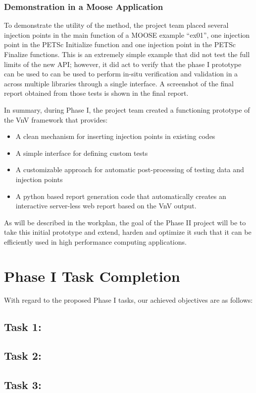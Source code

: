 \subsubsection{ Demonstration in a Moose Application } 
To demonstrate the utility of the method, the project team placed several injection points 
in the main function of a MOOSE example ``ex01'', one injection point in the PETSc Initialize function and 
one injection point in the PETSc Finalize functions. This is an extremely simple example that 
did not test the full limits of the new API; however, it did act to verify that the phase I prototype 
can be used to can be used to perform in-situ verification and validation in a across multiple libraries 
through a single interface. A screenshot of the final \VV report obtained from those tests is shown in the 
final report. 

In summary, during Phase I, the project team created a functioning prototype of the VnV framework that provides:
\begin{itemize}
 \item A clean mechanism for inserting injection points in existing codes
 \item A simple interface for defining custom tests 
 \item A customizable approach for automatic post-processing of testing data and injection points
 \item A python based report generation code that automatically creates an interactive server-less web report based on the VnV output.
\end{itemize}

As will be described in the workplan, the goal of the Phase II project will be to take this initial prototype and extend, harden and 
optimize it such that it can be efficiently used in high performance computing applications. 

\section{Phase I Task Completion}
With regard to the proposed Phase I tasks, our achieved objectives are as 
follows:

\subsection{Task 1: }


\subsection{Task 2: }


\subsection{Task 3: }
